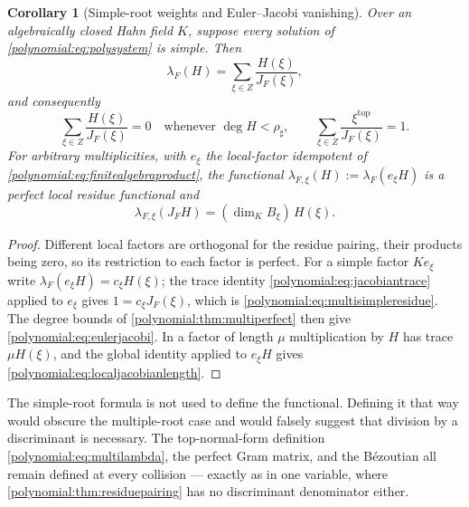 \documentclass[11pt,letterpaper]{article}
\numberwithin{equation}{section}
\newtheorem{corollary}[theorem]{Corollary}
\theoremstyle{definition}
\theoremstyle{remark}\newtheorem{remark}[theorem]{Remark}
\begin{document}
\begin{corollary}[Simple-root weights and Euler--Jacobi vanishing]
\label{polynomial:cor:eulerjacobi}
Over an algebraically closed Hahn field $K$, suppose every solution of
\eqref{polynomial:eq:polysystem} is simple. Then
\begin{equation}\label{polynomial:eq:multisimpleresidue}
 \lambda_F(H)=\sum_{\xi\in Z}\frac{H(\xi)}{J_F(\xi)},
\end{equation}
and consequently
\begin{equation}\label{polynomial:eq:eulerjacobi}
 \sum_{\xi\in Z}\frac{H(\xi)}{J_F(\xi)}=0\quad\text{whenever }
 \deg H<\rho_\sharp,
 \qquad
 \sum_{\xi\in Z}\frac{\xi^{\mathrm{top}}}{J_F(\xi)}=1 .
\end{equation}
For arbitrary multiplicities, with $e_\xi$ the local-factor idempotent of
\eqref{polynomial:eq:finitealgebraproduct}, the functional
$\lambda_{F,\xi}(H):=\lambda_F(e_\xi H)$ is a perfect local residue functional
and
\begin{equation}\label{polynomial:eq:localjacobianlength}
 \lambda_{F,\xi}(J_FH)=(\dim_KB_\xi)\,H(\xi).
\end{equation}
\end{corollary}
\begin{proof}
Different local factors are orthogonal for the residue pairing, their products
being zero, so its restriction to each factor is perfect. For a simple factor
$Ke_\xi$ write $\lambda_F(e_\xi H)=c_\xi H(\xi)$; the trace identity
\eqref{polynomial:eq:jacobiantrace} applied to $e_\xi$ gives $1=c_\xi
J_F(\xi)$, which is \eqref{polynomial:eq:multisimpleresidue}. The degree
bounds of \cref{polynomial:thm:multiperfect} then give
\eqref{polynomial:eq:eulerjacobi}. In a factor of length $\mu$ multiplication
by $H$ has trace $\mu H(\xi)$, and the global identity applied to $e_\xi H$
gives \eqref{polynomial:eq:localjacobianlength}.
\end{proof}

The simple-root formula is not used to define the functional. Defining it that
way would obscure the multiple-root case and would falsely suggest that
division by a discriminant is necessary. The top-normal-form definition
\eqref{polynomial:eq:multilambda}, the perfect Gram matrix, and the
B\'ezoutian all remain defined at every collision --- exactly as in one
variable, where \cref{polynomial:thm:residuepairing} has no discriminant
denominator either.
\end{document}
